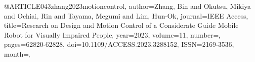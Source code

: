 @ARTICLE{043zhang2023motioncontrol,
author={Zhang, Bin and Okutsu, Mikiya and Ochiai, Rin and Tayama, Megumi and Lim, Hun-Ok},
journal={IEEE Access}, 
title={Research on Design and Motion Control of a Considerate Guide Mobile Robot for Visually Impaired People}, 
year={2023},
volume={11},
number={},
pages={62820-62828},
doi={10.1109/ACCESS.2023.3288152},
ISSN={2169-3536},
month={},}